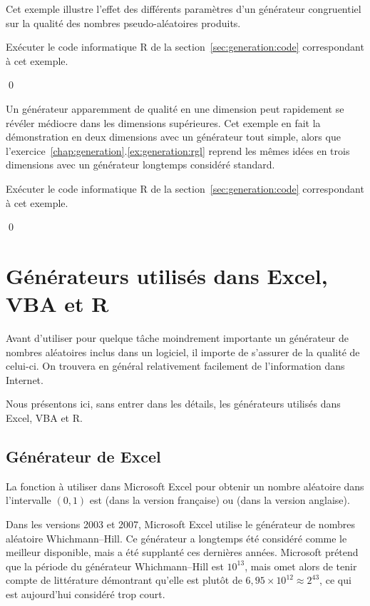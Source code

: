\begin{exemple}
  \label{ex:generation:rand}
  Cet exemple illustre l'effet des différents paramètres d'un
  générateur congruentiel sur la qualité des nombres pseudo-aléatoires
  produits.

  \begin{gotoR}
    Exécuter le code informatique R de la
    section~\ref{sec:generation:code} correspondant à cet exemple.
  \end{gotoR}
  \qed
\end{exemple}

\begin{exemple}
  Un générateur apparemment de qualité en une dimension peut
  rapidement se révéler médiocre dans les dimensions supérieures. Cet
  exemple en fait la démonstration en deux dimensions avec un
  générateur tout simple, alors que
  l'exercice~\ref{chap:generation}.\ref{ex:generation:rgl} reprend les
  mêmes idées en trois dimensions avec un générateur longtemps
  considéré standard.

  \begin{gotoR}
    Exécuter le code informatique R de la
    section~\ref{sec:generation:code} correspondant à cet exemple.
  \end{gotoR}
  \qed
\end{exemple}


\section{Générateurs utilisés dans Excel, VBA et R}

Avant d'utiliser pour quelque tâche moindrement importante un
générateur de nombres aléatoires inclus dans un logiciel, il importe
de s'assurer de la qualité de celui-ci. On trouvera en général
relativement facilement de l'information dans Internet.

Nous présentons ici, sans entrer dans les détails, les générateurs
utilisés dans Excel, VBA et R.

\subsection{Générateur de Excel}

La fonction à utiliser dans Microsoft Excel pour obtenir un nombre
aléatoire dans l'intervalle $(0, 1)$ est  (dans la
version française) ou  (dans la version anglaise).

Dans les versions 2003 et 2007, Microsoft Excel utilise le générateur
de nombres aléatoire Whichmann--Hill. Ce générateur a longtemps été
considéré comme le meilleur disponible, mais a été supplanté ces
dernières années. Microsoft prétend que la période du générateur
Whichmann--Hill est $10^{13}$, mais omet alors de tenir compte de
littérature démontrant qu'elle est plutôt de $6,95 \times 10^{12}
\approx 2^{43}$, ce qui est aujourd'hui considéré trop court.

